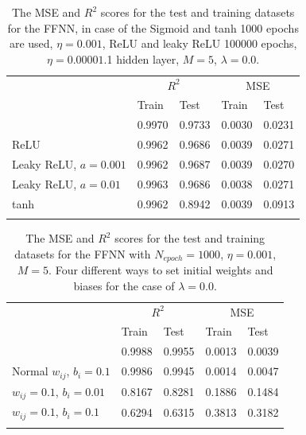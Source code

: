 \documentclass{emulateapj}
\begin{document}
\begin{table}[!htb]
\begin{center}
\caption{ The MSE and $R^2$ scores for the test and training datasets for the FFNN, in case of the Sigmoid and tanh 1000 epochs are used, $\eta=0.001$, ReLU and leaky ReLU 100000 epochs, $\eta=0.00001$.1 hidden layer, $M=5$, $\lambda=0.0$. }
\label{tab:activation functions}  
\begin{tabular}{lllll}
\cline{2-5}
\noalign{\smallskip}
\cline{2-5}\noalign{\smallskip}
& \multicolumn{2}{c}{$R^2$} & \multicolumn{2}{c}{MSE}\\
\cline{2-5}\noalign{\smallskip} & Train &  Test  & Train & Test \\
\hline\noalign{\smallskip}
\multicolumn{1}{l|}{Sigmoid} & 0.9970 & 0.9733 & 0.0030 & 0.0231 \\
\multicolumn{1}{l|}{ReLU} & 0.9962 & 0.9686 & 0.0039 & 0.0271 \\
\multicolumn{1}{l|}{Leaky ReLU, $a=0.001$} & 0.9962 & 0.9687 & 0.0039 & 0.0270\\
\multicolumn{1}{l|}{Leaky ReLU, $a=0.01$} & 0.9963 & 0.9686 & 0.0038 & 0.0271\\
\multicolumn{1}{l|}{tanh} & 0.9962 & 0.8942 & 0.0039 & 0.0913
\\\noalign{\smallskip}\hline
\end{tabular}
\end{center}
\end{table}

\begin{table}[!htb]
\begin{center}
\caption{The MSE and $R^2$ scores for the test and training datasets for the FFNN with $N_{epoch}=1000$, $\eta=0.001$, $M=5$. Four different ways to set initial weights and biases for the case of $\lambda=0.0$.}
\label{tab:bias and weight FFNN}  
\begin{tabular}{lllll}
\cline{2-5}
\noalign{\smallskip}
\cline{2-5}\noalign{\smallskip}
& \multicolumn{2}{c}{$R^2$} & \multicolumn{2}{c}{MSE}\\
\cline{2-5}\noalign{\smallskip} & Train &  Test  & Train & Test \\
\hline\noalign{\smallskip}
\multicolumn{1}{l|}{Normal $w_{ij}$, $b_i=0.01$} & 0.9988 & 0.9955 & 0.0013 & 0.0039 \\
\multicolumn{1}{l|}{Normal $w_{ij}$, $b_i=0.1$} & 0.9986 & 0.9945 & 0.0014 & 0.0047 \\
\multicolumn{1}{l|}{$w_{ij}=0.1$, $b_i=0.01$} & 0.8167 & 0.8281 & 0.1886 &  0.1484\\
\multicolumn{1}{l|}{$w_{ij}=0.1$, $b_i=0.1$} & 0.6294 & 0.6315 & 0.3813 & 0.3182 \\\noalign{\smallskip}\hline
\end{tabular}
\end{center}
\end{table}
\end{document}
